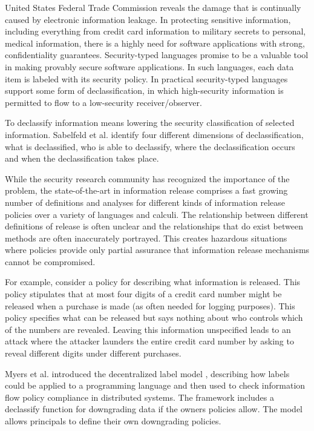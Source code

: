 United States Federal Trade Commission reveals the damage that is continually caused by electronic information leakage. In protecting sensitive information, including everything from credit card information to military secrets to personal, medical information, there is a highly
need for software applications with strong, confidentiality guarantees.
Security-typed languages promise to be a valuable tool in making provably secure software applications. In such languages, each
data item is labeled with its security policy. In practical security-typed languages support some form of declassification, in which high-security information is permitted to flow to a low-security receiver/observer.

To declassify information means lowering the security classification of selected information. Sabelfeld et al. \cite{ref_3_sabelfeld2009declassification} identify four different dimensions of declassification, what is declassified, who is able to declassify, where the declassification occurs and when the declassification takes place.

While the security research community has recognized the importance of the problem, the state-of-the-art in information release comprises a fast growing number of definitions and analyses for different kinds of information release policies over a variety of languages and calculi. The relationship between different definitions of release is often unclear and the relationships that do exist between methods are
often inaccurately portrayed. This creates hazardous situations where policies provide only partial assurance that information release mechanisms cannot be compromised.

For example, consider a policy for describing what information is released. This policy stipulates that at most four digits of a credit card number might be released when a purchase is made (as often needed for logging purposes). This policy specifies what can be released but says nothing about who controls which of the numbers are revealed.
Leaving this information unspecified leads to an attack where the attacker launders the entire credit card number by asking to reveal different digits under different purchases.

Myers et al. introduced the decentralized label model \cite{ref_4_myers2000protecting}, describing how labels could be applied
to a programming language and then used to check information
flow policy compliance in distributed systems. The framework
includes a declassify function for downgrading data if the
owners policies allow. The model allows principals to define their own downgrading policies.

